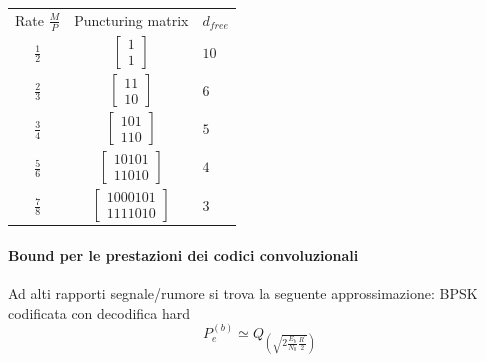                 \begin{table}[H]
                    \centering
                    \begin{tabular}{ccl}
                    \cline{1-3}
                    Rate $\frac{M}{P}$ & Puncturing matrix & $d_{free}$ \\ \cline{1-3}
                    $\frac{1}{2}$ &  $\begin{bmatrix}1\\1\end{bmatrix}$ &$10$\\
                    $\frac{2}{3}$ &  $\begin{bmatrix}11\\10\end{bmatrix}$ &$6$\\
                    $\frac{3}{4}$ &  $\begin{bmatrix}101\\110\end{bmatrix}$ &$5$\\
                    $\frac{5}{6}$ &  $\begin{bmatrix}10101\\11010\end{bmatrix}$ &$4$\\
                    $\frac{7}{8}$ &  $\begin{bmatrix}1000101\\1111010\end{bmatrix}$ &$3$
                    \end{tabular}
                \end{table}
            \paragraph{Bound per le prestazioni dei codici convoluzionali}
                Ad alti rapporti segnale/rumore si trova la seguente approssimazione: BPSK codificata con 
                decodifica hard
                \[
                    P_e^{(b)} \simeq Q_{\left(\sqrt{2\frac{E_b}{N_0}\frac{R^\prime}{2}}\right)}  
                \] 